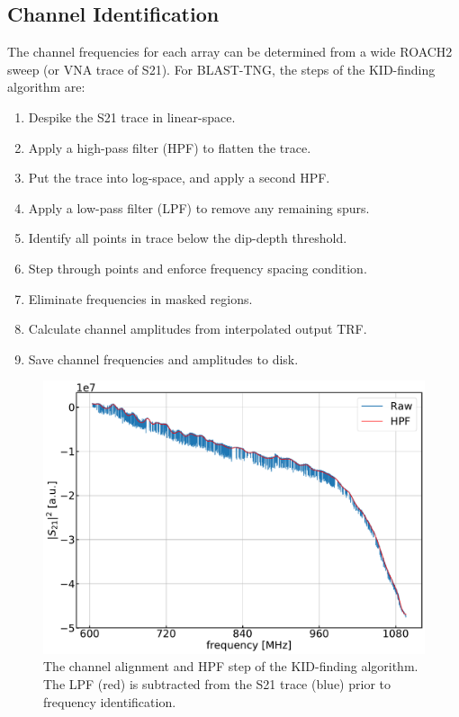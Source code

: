\subsection{Channel Identification}\label{KID-finding}

The channel frequencies for each array can be determined from a wide ROACH2 sweep (or VNA trace of \gls{S21}). For BLAST-TNG, the steps of the KID-finding algorithm are:

\begin{enumerate}[nosep]
  \item Despike the \gls{S21} trace in linear-space.
  \item Apply a high-pass filter (HPF) to flatten the trace.
  \item Put the trace into log-space, and apply a second HPF\@.
  \item Apply a low-pass filter (LPF) to remove any remaining spurs.
  \item Identify all points in trace below the dip-depth threshold.
  \item Step through points and enforce frequency spacing condition.
  \item Eliminate frequencies in masked regions.
  \item Calculate channel amplitudes from interpolated output TRF\@.
  \item Save channel frequencies and amplitudes to disk.
\end{enumerate}

\vspace{5mm}

\begin{figure}[!htbp]
\centering
\includegraphics[width=\textwidth]{figures/blast_data/sweeps/350FK_HPF_PAL}
\caption[~The channel alignment and HPF step of the KID-finding algorithm.]{The channel alignment and HPF step of the KID-finding algorithm. The LPF (red) is subtracted from the \gls{S21} trace (blue) prior to frequency identification.}
\label{fig:350FK_HPF}
\end{figure}

